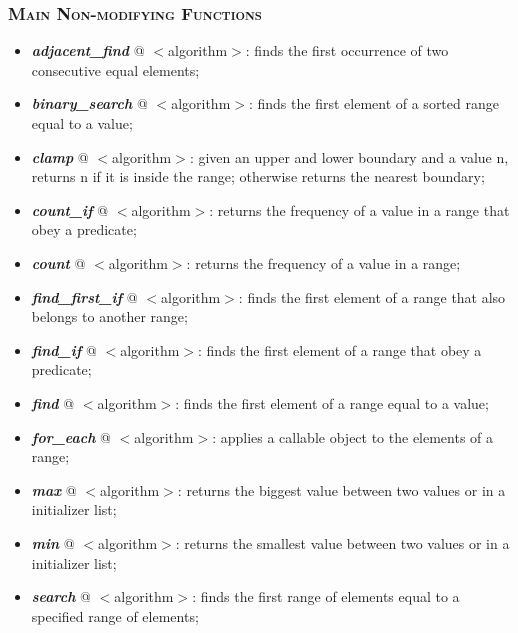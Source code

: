 \documentclass[10pt]{article}
\begin{document}
\begin{multicols*}{5}
{\subsubsection*{\textsc{Main Non-modifying Functions}} 
\begin{itemize}[leftmargin=*,topsep=0.25pt]
  \setlength\itemsep{-1.8pt}
	\item  \emph{\textbf{adjacent\_find}} @ $<$algorithm$>$: finds the first occurrence of two consecutive equal elements;
	\item  \emph{\textbf{binary\_search}} @ $<$algorithm$>$: finds the first element of a sorted range equal to a value;  
	\item  \emph{\textbf{clamp}} @ $<$algorithm$>$: given an upper and lower boundary and a value n, returns n if it is inside the range; otherwise returns the nearest boundary;  
	\item  \emph{\textbf{count\_if}} @ $<$algorithm$>$: returns the frequency of a value in a range that obey a predicate;
	\item  \emph{\textbf{count}} @ $<$algorithm$>$: returns the frequency of a value in a range; 
	\item  \emph{\textbf{find\_first\_if}} @ $<$algorithm$>$: finds the first element of a range that also belongs to another range;  
	\item  \emph{\textbf{find\_if}} @ $<$algorithm$>$: finds the first element of a range that obey a predicate;
	\item  \emph{\textbf{find}} @ $<$algorithm$>$: finds the first element of a range equal to a value; 
	\item  \emph{\textbf{for\_each}} @ $<$algorithm$>$: applies a callable object to the elements of a range;
	\item  \emph{\textbf{max}} @ $<$algorithm$>$: returns the biggest value between two values or in a initializer list;  
	\item  \emph{\textbf{min}} @ $<$algorithm$>$: returns the smallest value between two values or in a initializer list;  
	\item  \emph{\textbf{search}} @ $<$algorithm$>$: finds the first range of elements equal to a specified range of elements;  
\end{itemize}



}
\end{multicols*}
\end{document}
